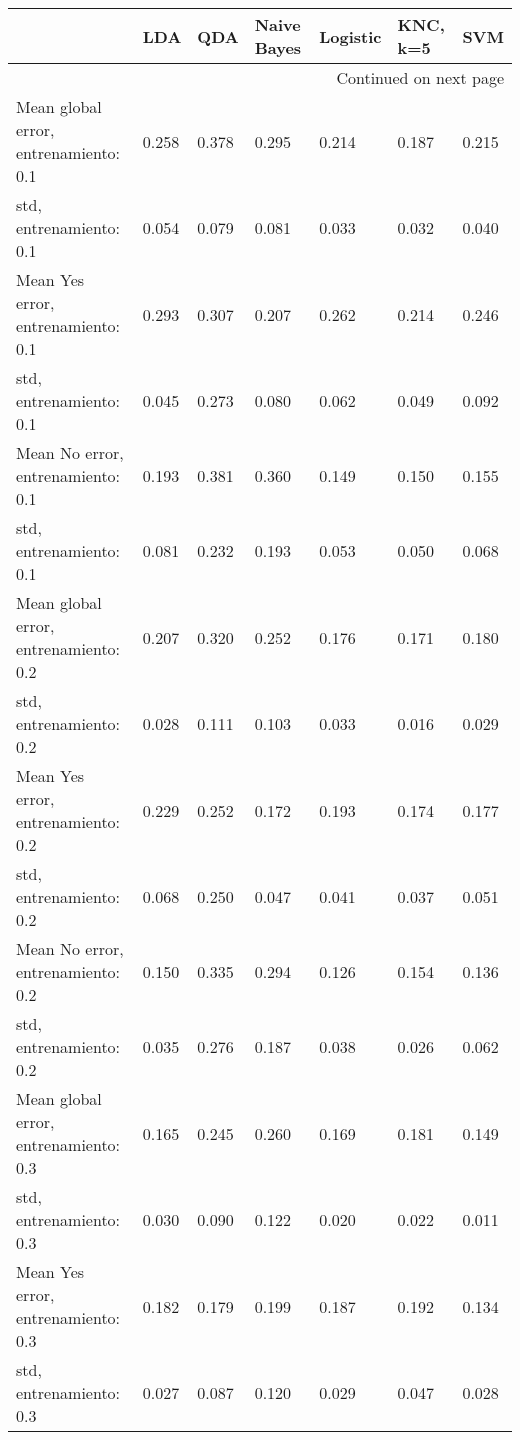 \begin{longtable}{p{4cm}|p{1.5cm}|p{1.5cm}|p{1.5cm}|p{1.5cm}|p{1.5cm}|p{1.5cm}}
\toprule
{} &   LDA &   QDA &  Naive Bayes &  Logistic &  KNC, k=5 &   SVM \\
\midrule
\endhead
\midrule
\multicolumn{7}{r}{{Continued on next page}} \\
\midrule
\endfoot

\bottomrule
\endlastfoot
Mean global error, entrenamiento: 0.1 & 0.258 & 0.378 &        0.295 &     0.214 &     0.187 & 0.215 \\
std, entrenamiento: 0.1               & 0.054 & 0.079 &        0.081 &     0.033 &     0.032 & 0.040 \\
Mean Yes error, entrenamiento: 0.1    & 0.293 & 0.307 &        0.207 &     0.262 &     0.214 & 0.246 \\
std, entrenamiento: 0.1               & 0.045 & 0.273 &        0.080 &     0.062 &     0.049 & 0.092 \\
Mean No error, entrenamiento: 0.1     & 0.193 & 0.381 &        0.360 &     0.149 &     0.150 & 0.155 \\
std, entrenamiento: 0.1               & 0.081 & 0.232 &        0.193 &     0.053 &     0.050 & 0.068 \\
Mean global error, entrenamiento: 0.2 & 0.207 & 0.320 &        0.252 &     0.176 &     0.171 & 0.180 \\
std, entrenamiento: 0.2               & 0.028 & 0.111 &        0.103 &     0.033 &     0.016 & 0.029 \\
Mean Yes error, entrenamiento: 0.2    & 0.229 & 0.252 &        0.172 &     0.193 &     0.174 & 0.177 \\
std, entrenamiento: 0.2               & 0.068 & 0.250 &        0.047 &     0.041 &     0.037 & 0.051 \\
Mean No error, entrenamiento: 0.2     & 0.150 & 0.335 &        0.294 &     0.126 &     0.154 & 0.136 \\
std, entrenamiento: 0.2               & 0.035 & 0.276 &        0.187 &     0.038 &     0.026 & 0.062 \\
Mean global error, entrenamiento: 0.3 & 0.165 & 0.245 &        0.260 &     0.169 &     0.181 & 0.149 \\
std, entrenamiento: 0.3               & 0.030 & 0.090 &        0.122 &     0.020 &     0.022 & 0.011 \\
Mean Yes error, entrenamiento: 0.3    & 0.182 & 0.179 &        0.199 &     0.187 &     0.192 & 0.134 \\
std, entrenamiento: 0.3               & 0.027 & 0.087 &        0.120 &     0.029 &     0.047 & 0.028 \\

\end{longtable}
